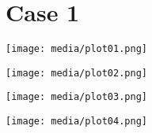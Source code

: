 \documentclass{report}
\begin{document}
\section{Case 1}

\texttt{[image: media/plot01.png]}

\texttt{[image: media/plot02.png]}

\texttt{[image: media/plot03.png]}

\texttt{[image: media/plot04.png]}
\end{document}
